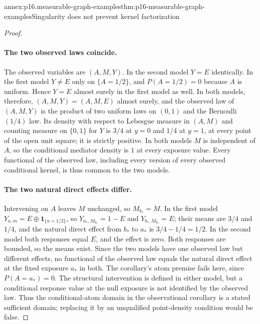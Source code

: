 \begin{annexitem}{annex:p16.measurable-graph-examples}{thm:p16-measurable-graph-examples}{Singularity does not prevent kernel factorization}
\begin{proof}
\paragraph{The two observed laws coincide.}
The observed variables are \((A,M,Y)\). In the second model \(Y=E\)
identically. In the first model \(Y\neq E\) only on \(\{A=1/2\}\),
and \(P(A=1/2)=0\) because \(A\) is uniform. Hence \(Y=E\) almost
surely in the first model as well. In both models, therefore,
\((A,M,Y)=(A,M,E)\) almost surely, and the observed law of
\((A,M,Y)\) is the product of two uniform laws on \((0,1)\) and the
Bernoulli\((1/4)\) law. Its density with respect to Lebesgue measure
in \((A,M)\) and counting measure on \(\{0,1\}\) for \(Y\) is \(3/4\)
at \(y=0\) and \(1/4\) at \(y=1\), at every point of the open unit
square; it is strictly positive. In both models \(M\) is independent
of \(A\), so the conditional mediator density is \(1\) at every
exposure value. Every functional of the observed law, including
every version of every observed conditional kernel, is thus common to
the two models.

\paragraph{The two natural direct effects differ.}
Intervening on \(A\) leaves \(M\) unchanged, so \(M_{b_*}=M\). In
the first model \(Y_{a,m}=E\oplus\mathbf1_{\{a=1/2\}}\), so
\(Y_{a_*,M_{b_*}}=1-E\) and \(Y_{b_*,M_{b_*}}=E\); their means are
\(3/4\) and \(1/4\), and the natural direct effect from \(b_*\) to
\(a_*\) is \(3/4-1/4=1/2\). In the second model both responses equal
\(E\), and the effect is zero. Both responses are bounded, so the
means exist. Since the two models have one observed law but
different effects, no functional of the observed law equals the
natural direct effect at the fixed exposure \(a_*\) in both. The
corollary's atom premise fails here, since \(P(A=a_*)=0\). The
structural intervention is defined in either model, but a
conditional response value at the null exposure is not identified
by the observed law. Thus the conditional-atom domain in the
observational corollary is a stated sufficient domain; replacing
it by an unqualified point-density condition would be false.
\end{proof}
\end{annexitem}
